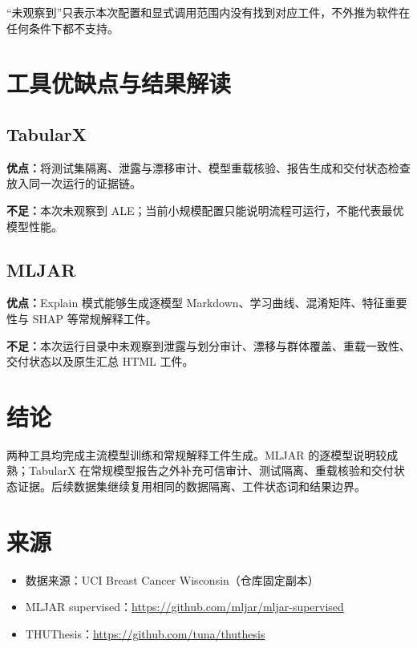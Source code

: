 \documentclass[degree=bachelor,language=chinese,fontset=fandol]{thuthesis}
\begin{document}
“未观察到”只表示本次配置和显式调用范围内没有找到对应工件，不外推为软件在任何条件下都不支持。

\chapter{工具优缺点与结果解读}
\section{TabularX}
\textbf{优点：}将测试集隔离、泄露与漂移审计、模型重载核验、报告生成和交付状态检查放入同一次运行的证据链。

\textbf{不足：}本次未观察到 ALE；当前小规模配置只能说明流程可运行，不能代表最优模型性能。

\section{MLJAR}
\textbf{优点：}Explain 模式能够生成逐模型 Markdown、学习曲线、混淆矩阵、特征重要性与 SHAP 等常规解释工件。

\textbf{不足：}本次运行目录中未观察到泄露与划分审计、漂移与群体覆盖、重载一致性、交付状态以及原生汇总 HTML 工件。

\chapter{结论}
两种工具均完成主流模型训练和常规解释工件生成。MLJAR 的逐模型说明较成熟；TabularX 在常规模型报告之外补充可信审计、测试隔离、重载核验和交付状态证据。后续数据集继续复用相同的数据隔离、工件状态词和结果边界。

\backmatter
\chapter{来源}
\begin{itemize}
  \item 数据来源：UCI Breast Cancer Wisconsin（仓库固定副本）
  \item MLJAR supervised：\url{https://github.com/mljar/mljar-supervised}
  \item THUThesis：\url{https://github.com/tuna/thuthesis}
\end{itemize}
\end{document}
